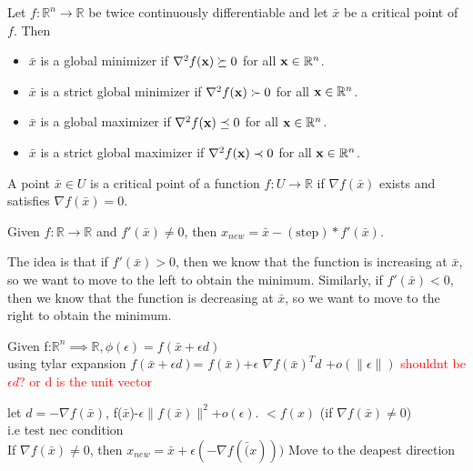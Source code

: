 \begin{theorem}[]
  Let $f: \mathbb R^n \to \mathbb R$ be twice continuously differentiable and let $\bar{x}$ be a critical point of $f$. Then
  \begin{itemize}
    \item $\bar x$ is a global minimizer if $\nabla^2 f(\textbf{x}) \succeq 0$ for all $\textbf{x} \in \mathbb R^n$.
    \item $\bar x$ is a strict global minimizer if $\nabla^2 f(\textbf{x}) \succ 0$ for all $\textbf{x} \in \mathbb R^n$.
    \item $\bar x$ is a global maximizer if $\nabla^2 f(\textbf{x}) \preceq 0$ for all $\textbf{x} \in \mathbb R^n$.
    \item $\bar x$ is a strict global maximizer if $\nabla^2 f(\textbf{x}) \prec 0$ for all $\textbf{x} \in \mathbb R^n$.
  \end{itemize}
\end{theorem}

\begin{definition}
    A point $\bar x \in U$ is a critical point of a function $f: U \rightarrow \mathbb R$ if $\nabla f(\bar x)$ exists and satisfies $\nabla f(\bar x) = 0$.
\end{definition}

\begin{problem}
    Given $f: \mathbb{R}\rightarrow \mathbb{R}$ and $f'(\bar{x})\neq 0$, then $x_{new}=\bar{x}-(\text{step})*f'(\bar{x})$.
    
    The idea is that if $f'(\bar x) > 0$, then we know that the function is increasing at $\bar x$, so we want to move to the left to obtain the minimum. Similarly, if $f'(\bar x) < 0$, then we know that the function is decreasing at $\bar x$, so we want to move to the right to obtain the minimum.
\end{problem}

\begin{problem}
    Given f:$\mathbb{R}^n \implies \mathbb{R}, \phi(\epsilon)=f(\bar{x}+\epsilon d)$ 
    \\ using tylar expansion 
    $f(\bar{x}+\epsilon d)$=
    $f(\bar{x})$+$\epsilon$ $\nabla f(\bar{x})^T d$ +$o(\|\epsilon\|)$ \textcolor{red}{shouldnt be $\epsilon d$? or d is the unit vector}

    let $d=-\nabla f(\bar{x})$, f($\bar{x}$)-$\epsilon \| f(\bar{x})\|^2$+$o(\epsilon)$.
    $<f(x)$ (if $\nabla f(\bar{x})\neq 0$)
    \\ i.e test nec condition 
    \\ If $\nabla f(\bar{x})\neq 0$, then $x_{new}=\bar{x}+\epsilon(-\nabla f(\bar(x)))$
    Move to the deapest direction


    
\end{problem}

